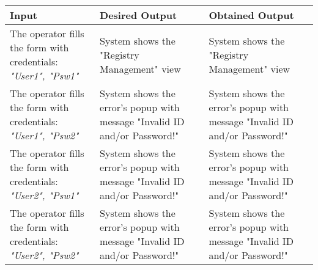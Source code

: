 {{{\begin{center}
			\begin{tabular}{|p{4cm}|p{5cm}|p{5cm}|}
			\hline
			\centering \vspace{1mm} \bfseries{Input} \vspace{1mm} & \vspace{1mm} \bfseries{Desired Output} \vspace{1mm} & \vspace{1mm} \bfseries{Obtained Output} \vspace{1mm}\\
			\hline
				\vspace{1mm} The operator fills the form with credentials: \itshape{"User1", "Psw1"} \vspace{1mm} &
				\vspace{1mm} System shows the "Registry Management" view \vspace{1mm} & 
				\vspace{1mm} System shows the "Registry Management" view \vspace{1mm} \\
			\hline
				\vspace{1mm} The operator fills the form with credentials: \itshape{"User1", "Psw2"} \vspace{1mm} &
				\vspace{1mm} System shows the error's popup with message "Invalid ID and/or Password!" \vspace{1mm} & 
				\vspace{1mm} System shows the error's popup with message "Invalid ID and/or Password!" \vspace{1mm} \\
			\hline
				\vspace{1mm} The operator fills the form with credentials: \itshape{"User2", "Psw1"} \vspace{1mm} &
				\vspace{1mm} System shows the error's popup with message "Invalid ID and/or Password!" \vspace{1mm} & 
				\vspace{1mm} System shows the error's popup with message "Invalid ID and/or Password!" \vspace{1mm} \\
			\hline
				\vspace{1mm} The operator fills the form with credentials: \itshape{"User2", "Psw2"} \vspace{1mm} &
				\vspace{1mm} System shows the error's popup with message "Invalid ID and/or Password!" \vspace{1mm} & 
				\vspace{1mm} System shows the error's popup with message "Invalid ID and/or Password!" \vspace{1mm} \\
			\hline
			\end{tabular}
			\end{center}
		}
		\clearpage

}}
